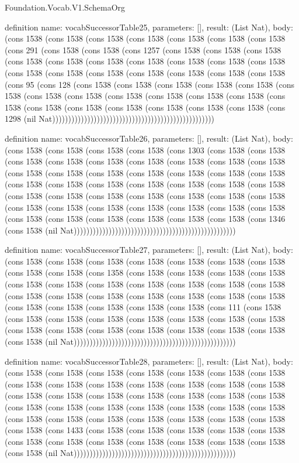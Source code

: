\begin{lexlean}{Foundation.Vocab.V1.SchemaOrg}
\begin{semanticmodule}
definition{
  name: vocabSuccessorTable25,
  parameters: [],
  result: (List Nat),
  body: (cons 1538 (cons 1538 (cons 1538 (cons 1538 (cons 1538 (cons 1538 (cons 1538 (cons 291 (cons 1538 (cons 1538 (cons 1257 (cons 1538 (cons 1538 (cons 1538 (cons 1538 (cons 1538 (cons 1538 (cons 1538 (cons 1538 (cons 1538 (cons 1538 (cons 1538 (cons 1538 (cons 1538 (cons 1538 (cons 1538 (cons 1538 (cons 1538 (cons 95 (cons 128 (cons 1538 (cons 1538 (cons 1538 (cons 1538 (cons 1538 (cons 1538 (cons 1538 (cons 1538 (cons 1538 (cons 1538 (cons 1538 (cons 1538 (cons 1538 (cons 1538 (cons 1538 (cons 1538 (cons 1538 (cons 1538 (cons 1538 (cons 1298 (nil Nat)))))))))))))))))))))))))))))))))))))))))))))))))))
}

definition{
  name: vocabSuccessorTable26,
  parameters: [],
  result: (List Nat),
  body: (cons 1538 (cons 1538 (cons 1538 (cons 1538 (cons 1303 (cons 1538 (cons 1538 (cons 1538 (cons 1538 (cons 1538 (cons 1538 (cons 1538 (cons 1538 (cons 1538 (cons 1538 (cons 1538 (cons 1538 (cons 1538 (cons 1538 (cons 1538 (cons 1538 (cons 1538 (cons 1538 (cons 1538 (cons 1538 (cons 1538 (cons 1538 (cons 1538 (cons 1538 (cons 1538 (cons 1538 (cons 1538 (cons 1538 (cons 1538 (cons 1538 (cons 1538 (cons 1538 (cons 1538 (cons 1538 (cons 1538 (cons 1538 (cons 1538 (cons 1538 (cons 1538 (cons 1538 (cons 1538 (cons 1538 (cons 1538 (cons 1346 (cons 1538 (nil Nat)))))))))))))))))))))))))))))))))))))))))))))))))))
}

definition{
  name: vocabSuccessorTable27,
  parameters: [],
  result: (List Nat),
  body: (cons 1538 (cons 1538 (cons 1538 (cons 1538 (cons 1538 (cons 1538 (cons 1538 (cons 1538 (cons 1538 (cons 1358 (cons 1538 (cons 1538 (cons 1538 (cons 1538 (cons 1538 (cons 1538 (cons 1538 (cons 1538 (cons 1538 (cons 1538 (cons 1538 (cons 1538 (cons 1538 (cons 1538 (cons 1538 (cons 1538 (cons 1538 (cons 1538 (cons 1538 (cons 1538 (cons 1538 (cons 1538 (cons 1538 (cons 111 (cons 1538 (cons 1538 (cons 1538 (cons 1538 (cons 1538 (cons 1538 (cons 1538 (cons 1538 (cons 1538 (cons 1538 (cons 1538 (cons 1538 (cons 1538 (cons 1538 (cons 1538 (cons 1538 (nil Nat)))))))))))))))))))))))))))))))))))))))))))))))))))
}

definition{
  name: vocabSuccessorTable28,
  parameters: [],
  result: (List Nat),
  body: (cons 1538 (cons 1538 (cons 1538 (cons 1538 (cons 1538 (cons 1538 (cons 1538 (cons 1538 (cons 1538 (cons 1538 (cons 1538 (cons 1538 (cons 1538 (cons 1538 (cons 1538 (cons 1538 (cons 1538 (cons 1538 (cons 1538 (cons 1538 (cons 1538 (cons 1538 (cons 1538 (cons 1538 (cons 1538 (cons 1538 (cons 1538 (cons 1538 (cons 1538 (cons 1538 (cons 1538 (cons 1538 (cons 1538 (cons 1538 (cons 1538 (cons 1538 (cons 1433 (cons 1538 (cons 1538 (cons 1538 (cons 1538 (cons 1538 (cons 1538 (cons 1538 (cons 1538 (cons 1538 (cons 1538 (cons 1538 (cons 1538 (cons 1538 (nil Nat)))))))))))))))))))))))))))))))))))))))))))))))))))
}


\end{semanticmodule}
\end{lexlean}
